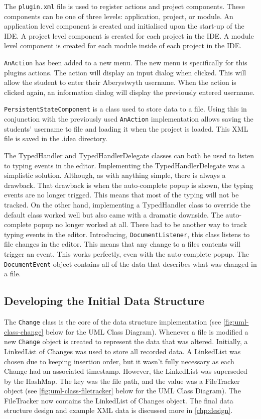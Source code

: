 The \texttt{plugin.xml} file is used to register actions and project components. These components can be one of three levels: application, project, or module\cite{IntelliJProjectComponents}. An application level component is created and initialised upon the start-up of the IDE. A project level component is created for each project in the IDE. A module level component is created for each module inside of each project in the IDE.

\texttt{AnAction} has been added to a new menu. The new menu is specifically for this plugins actions. The action will display an input dialog when clicked. This will allow the student to enter their Aberystwyth username. When the action is clicked again, an information dialog will display the previously entered username.

\texttt{PersistentStateComponent} is a class used to store data to a file. Using this in conjunction with the previously used \texttt{AnAction} implementation allows saving the students' username to file and loading it when the project is loaded. This XML file is saved in the .idea directory.

The TypedHandler and TypedHandlerDelegate classes can both be used to listen to typing events in the editor. Implementing the TypedHandlerDelegate was a simplistic solution. Although, as with anything simple, there is always a drawback. That drawback is when the auto-complete popup is shown, the typing events are no longer trigged. This means that most of the typing will not be tracked. On the other hand, implementing a TypedHandler class to override the default class worked well but also came with a dramatic downside. The auto-complete popup no longer worked at all. There had to be another way to track typing events in the editor. Introducing, \texttt{DocumentListener}, this class listens to file changes in the editor. This means that any change to a files contents will trigger an event. This works perfectly, even with the auto-complete popup. The \texttt{DocumentEvent} object contains all of the data that describes what was changed in a file.

\subsection{Developing the Initial Data Structure}
The \texttt{Change} class is the core of the data structure implementation (see \autoref{fig:uml-class-change} below for the UML Class Diagram). Whenever a file is modified a new \texttt{Change} object is created to represent the data that was altered. Initially, a LinkedList of Changes was used to store all recorded data. A LinkedList was chosen due to keeping insertion order, but it wasn't fully necessary as each Change had an associated timestamp. However, the LinkedList was superseded by the HashMap. The key was the file path, and the value was a FileTracker object (see \autoref{fig:uml-class-filetracker} below for the UML Class Diagram). The FileTracker now contains the LinkedList of Changes object. The final data structure design and example XML data is discussed more in \autoref{chp:design}.

